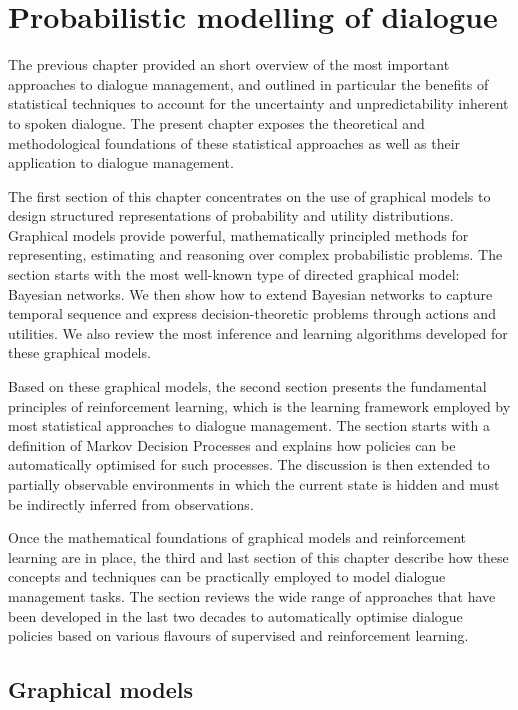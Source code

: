 \chapter{Probabilistic modelling of dialogue}
\label{chap:probmodelling}

The previous chapter provided an short overview of the most important approaches to dialogue management, and outlined in particular the benefits of statistical techniques to account for the uncertainty and unpredictability inherent to spoken dialogue. The present chapter exposes the theoretical and methodological foundations of these statistical approaches as well as their application to dialogue management. 

The first section of this chapter concentrates on the use of graphical models to design structured representations of probability and utility distributions. Graphical models provide powerful, mathematically principled methods for representing, estimating and reasoning over complex probabilistic problems. The section starts with the most well-known type of directed graphical model: Bayesian networks.  We then show how to extend Bayesian networks to capture temporal sequence and express decision-theoretic problems through actions and utilities. We also review the most inference and learning algorithms developed for these graphical models.

Based on these graphical models, the second section presents the fundamental principles of reinforcement learning, which is the learning framework employed by most statistical approaches to dialogue management. The section starts with a definition of Markov Decision Processes and explains how policies can be automatically optimised for such processes.  The discussion is then extended to partially observable environments in which the current state is hidden and must be indirectly inferred from observations.   

Once the mathematical foundations of graphical models and reinforcement learning are in place, the third and last section of this chapter describe how these concepts and techniques can be practically employed to model dialogue management tasks.  The section reviews the wide range of approaches that have been developed in the last two decades to automatically optimise dialogue policies based on various flavours of supervised and reinforcement learning.  

\section{Graphical models}
\label{sec:pgm}

